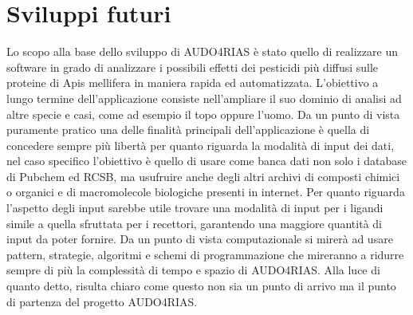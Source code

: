 \section*{Sviluppi futuri}
Lo scopo alla base dello sviluppo di AUDO4RIAS è stato quello di realizzare un software in grado di analizzare i possibili effetti dei pesticidi più diffusi sulle proteine di Apis mellifera in maniera rapida ed automatizzata. L’obiettivo a lungo termine dell’applicazione consiste nell’ampliare il suo dominio di analisi ad altre specie e casi, come ad esempio il topo oppure l’uomo.
Da un punto di vista puramente pratico una delle finalità principali dell’applicazione è quella di concedere sempre più libertà per quanto riguarda la modalità di input dei dati, nel caso specifico l’obiettivo è quello di usare come banca dati non solo i database di Pubchem ed RCSB, ma usufruire anche degli altri archivi di composti chimici o organici e di macromolecole biologiche presenti in internet. Per quanto riguarda l’aspetto degli input sarebbe utile trovare una modalità di input per i ligandi simile a quella sfruttata per i recettori, garantendo una maggiore quantità di input da poter fornire. Da un punto di vista computazionale si mirerà ad usare pattern, strategie, algoritmi e schemi di programmazione che mireranno a ridurre sempre di più la complessità di tempo e spazio di AUDO4RIAS. Alla luce di quanto detto, risulta chiaro come questo non sia un punto di arrivo ma il punto di partenza del progetto AUDO4RIAS.